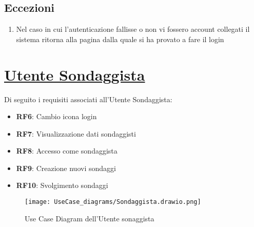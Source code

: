        \subsection{Eccezioni}
            \begin{enumerate}
                \item Nel caso in cui l'autenticazione fallisse o non vi fossero account collegati il sistema ritorna alla pagina dalla quale si ha provato a fare il login
            \end{enumerate}

\section{\underline{Utente Sondaggista}}
    Di seguito i requisiti associati all'Utente Sondaggista:
    \begin{itemize}
        \item \textbf{RF6}: Cambio icona login
        \item \textbf{RF7}: Visualizzazione dati sondaggisti
        \item \textbf{RF8}: Accesso come sondaggista
        \item \textbf{RF9}: Creazione nuovi sondaggi
        \item \textbf{RF10}: Svolgimento sondaggi
    \end{itemize}
    \begin{figure}[H]
        \centering
        \texttt{[image: UseCase\_diagrams/Sondaggista.drawio.png]}
        \caption{Use Case Diagram dell'Utente sonaggista}
    \end{figure}